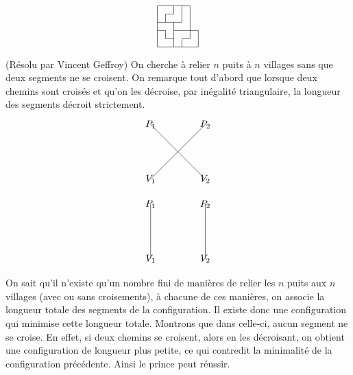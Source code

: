 \begin{sol}[34]
\[\begin{tikzpicture}[scale=0.3]
\draw (0, 0)--(0,5 );
\draw (1, 1)--(1,2 );
\draw (1, 3)--(1,4 );
\draw (2, 0)--(2,3 );
\draw (2, 4)--(2,5 );
\draw (3, 0)--(3,1 );
\draw (3, 3)--(3,5 );
\draw (4, 1)--(4,5 );
\draw (5, 0)--(5,2 );

\draw(0,0)--(5,0);
\draw(1,1)--(2,1);
\draw(3,1)--(4,1);
\draw(0,2)--(1,2);
\draw(2,2)--(5,2);
\draw(0,3)--(3,3);
\draw(1,4)--(2,4);
\draw(0,5)--(4,5);
\end{tikzpicture}\]

\end{sol}

\begin{sol}[62](Résolu par Vincent Geffroy)
On cherche \`a relier $n$ puits \`a $n$ villages sans que deux segments ne se croisent.
On remarque tout d'abord que lorsque deux chemins sont crois\'es et qu'on les d\'ecroise, par in\'egalit\'e triangulaire, la longueur des segments d\'ecroit strictement.
\[\begin{tikzpicture}[scale=1]
\draw (0, 0)--(2,2 );
\draw (2, 0)--(0,2 );
\node at (0,0) {$V_1$};
\node at (2,0) {$V_2$};
\node at (0,2) {$P_1$};
\node at (2,2) {$P_2$};

\end{tikzpicture}\]

\[\begin{tikzpicture}[scale=1]
\draw (0, 0)--(0,2 );
\draw (2, 0)--(2,2 );
\node at (0,0) {$V_1$};
\node at (2,0) {$V_2$};
\node at (0,2) {$P_1$};
\node at (2,2) {$P_2$};

\end{tikzpicture}\]

On sait qu'il n'existe qu'un nombre fini de mani\`eres de relier les $n$ puits aux $n$ villages (avec ou sans croisements), \`a chacune de ces mani\`eres, on associe la longueur totale des segments de la configuration. Il existe donc une configuration qui minimise cette longueur totale.
Montrons que dans celle-ci, aucun segment ne se croise.
En effet, si deux chemins se croisent, alors en les d\'ecroisant, on obtient une configuration de longueur plus petite, ce qui contredit la minimalit\'e de la configuration pr\'ec\'edente.
Ainsi le prince peut r\'eussir.




\end{sol}



